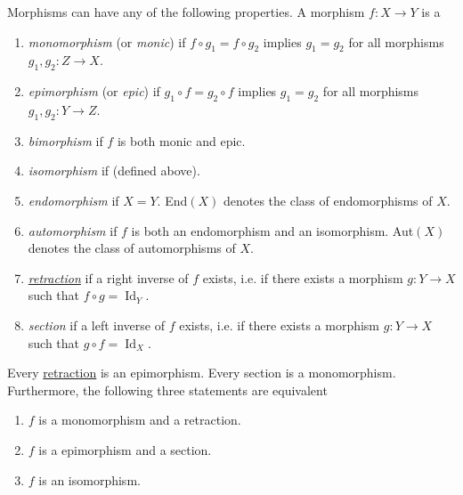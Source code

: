 \documentclass{article}
\DeclareMathOperator{\Id}{Id}
\newcounter{theorem}[section]
\newcounter{definition}[section]
\begin{document}
    \begin{definition}
      \label{def:monomorphism-epimorphism-section-retraction}
    Morphisms can have any of the following properties. A morphism $f: X \to Y$ is a
    \begin{enumerate}
        \item \textit{monomorphism} (or \textit{monic}) if $f \circ g_1 = f \circ g_2$ implies $g_1 = g_2$ for all morphisms $g_1, g_2: Z \to X$. 
        \item \textit{epimorphism} (or \textit{epic}) if $g_1 \circ f = g_2 \circ f$ implies $g_1 = g_2$ for all morphisms $g_1, g_2: Y \to Z$. 
        \item \textit{bimorphism} if $f$ is both monic and epic. 
        \item \textit{isomorphism} if (defined above). 
        \item \textit{endomorphism} if $X = Y$. End$(X)$ denotes the class of endomorphisms of $X$. 
        \item \textit{automorphism} if $f$ is both an endomorphism and an isomorphism. Aut$(X)$ denotes the class of automorphisms of $X$. 
        \item \textit{\hyperref[at-def:retraction]{retraction}} if a right inverse of $f$ exists, i.e. if there exists a morphism $g: Y \to X$ such that $f \circ g = \Id_Y$. 
        \item \textit{section} if a left inverse of $f$ exists, i.e. if there exists a morphism $g: Y \to X$ such that $g \circ f = \Id_X$. 
    \end{enumerate}
    \end{definition}

    \begin{theorem}
      \label{thm:relations-among-sections-retractions-and-iso}
    Every \hyperref[at-def:retraction]{retraction} is an epimorphism. Every section is a monomorphism. Furthermore, the following three statements are equivalent
    \begin{enumerate}
        \item $f$ is a monomorphism and a retraction. 
        \item $f$ is a epimorphism and a section. 
        \item $f$ is an isomorphism. 
    \end{enumerate}
    \end{theorem}
\end{document}

